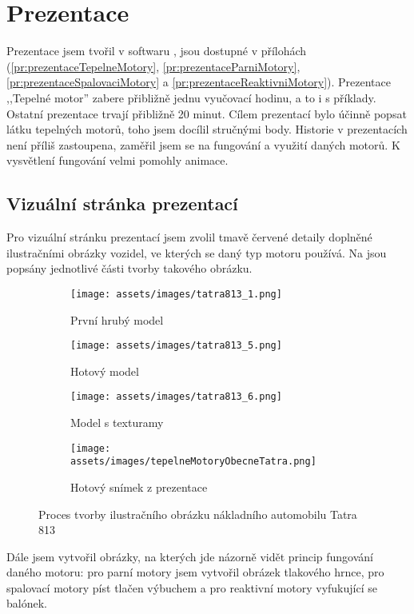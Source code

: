 \section{Prezentace}\label{sc:prezentace}
{Prezentace jsem tvořil v softwaru , jsou dostupné v přílohách (\ref{pr:prezentaceTepelneMotory}, \ref{pr:prezentaceParniMotory}, \ref{pr:prezentaceSpalovaciMotory} a \ref{pr:prezentaceReaktivniMotory}). Prezentace ,,Tepelné motor'' zabere přibližně jednu vyučovací hodinu, a to i s příklady. Ostatní prezentace trvají přibližně 20 minut.}\odst
{Cílem prezentací bylo účinně popsat látku tepelných motorů, toho jsem docílil stručnými body. Historie v prezentacích není příliš zastoupena, zaměřil jsem se na fungování a využití daných motorů. K vysvětlení fungování velmi pomohly animace.}

\subsection{Vizuální stránka prezentací}
{Pro vizuální stránku prezentací jsem zvolil tmavě červené detaily doplněné ilustračními obrázky vozidel, ve kterých se daný typ motoru používá. Na  jsou popsány jednotlivé části tvorby takového obrázku.}

\begin{figure}[H]
    \begin{subfigure}{0.5\textwidth}
        \centering
        \texttt{[image: assets/images/tatra813\_1.png]}\\
        \caption{První hrubý model}
    \end{subfigure}
    \begin{subfigure}{0.5\linewidth}
        \centering
        \texttt{[image: assets/images/tatra813\_5.png]}\\
        \caption{Hotový model}
    \end{subfigure}
    \begin{subfigure}{0.5\linewidth}
        \centering
        \texttt{[image: assets/images/tatra813\_6.png]}\\
        \caption{Model s texturamy}
    \end{subfigure}
    \begin{subfigure}{0.5\linewidth}
        \centering
        \texttt{[image: assets/images/tepelneMotoryObecneTatra.png]}\\
        \caption{Hotový snímek z prezentace}
    \end{subfigure}
    \caption{Proces tvorby ilustračního obrázku nákladního automobilu Tatra 813 \jaObr}
    \label{obr:tatra813}
\end{figure}

{Dále jsem vytvořil obrázky, na kterých jde názorně vidět princip fungování daného motoru: pro parní motory jsem vytvořil obrázek tlakového hrnce, pro spalovací motory píst tlačen výbuchem a pro reaktivní motory vyfukující se balónek.}